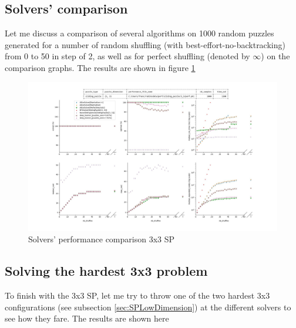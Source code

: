 \subsection{Solvers' comparison}
\label{ssec:33SPSC}
Let me discuss a comparison of several algorithms on 1000 random puzzles generated for a number of random shuffling (with best-effort-no-backtracking) from 0 to 50 in step of 2, as well as for perfect shuffling (denoted by $\infty$) on the comparison graphs. The results are shown in figure \ref{fig:33SPPerformance}

\begin{landscape}
\centering\vspace*{\fill}
\begin{figure}[H]
\centering
\includegraphics[scale=0.63]{./Figures/33SPPerformance.jpeg}
\caption[33SPPerformance]{Solvers' performance comparison 3x3 SP}
\label{fig:33SPPerformance}
\end{figure}
\vfill
\end{landscape}
\restoregeometry


\subsection{Solving the hardest 3x3 problem}
To finish with the 3x3 SP, let me try to throw one of the two hardest 3x3 configurations (see subsection \ref{sec:SPLowDimension}) at the different solvers to see how they fare. The results are shown here

